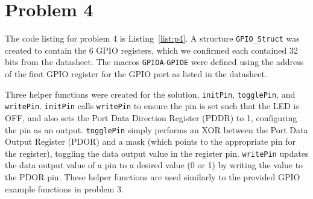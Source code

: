 \section*{Problem 4}
The code listing for problem 4 is Listing~\ref{list:p4}. A structure \texttt{GPIO\_Struct} was created to contain the 6 GPIO registers, which we confirmed each contained 32 bits from the datasheet. The macros \texttt{GPIOA}-\texttt{GPIOE} were defined using the address of the first GPIO register for the GPIO port as listed in the datasheet. 

Three helper functions were created for the solution, \texttt{initPin}, \texttt{togglePin}, and \texttt{writePin}. \texttt{initPin} calls \texttt{writePin} to ensure the pin is set such that the LED is OFF, and also sets the Port Data Direction Register (PDDR) to 1, configuring the pin as an output. \texttt{togglePin} simply performs an XOR between the Port Data Output Register (PDOR) and a mask (which points to the appropriate pin for the register), toggling the data output value in the register pin. \texttt{writePin} updates the data output value of a pin to a desired value (0 or 1) by writing the value to the PDOR pin. These helper functions are used similarly to the provided GPIO example functions in problem 3.


